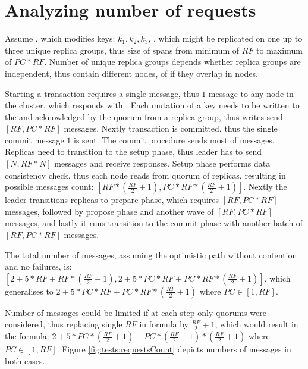 \section{Analyzing number of requests}
Assume \transaction, which modifies keys: $k_{1}, k_{2}, k_{3}$,
, which might be replicated on one up to three unique replica groups, thus size of \nodesTx spans from minimum of $RF$ to maximum of $PC*RF$. Number of unique replica groups depends whether replica groups are independent, thus contain different nodes, of if they overlap in nodes.

Starting a transaction requires a single message, thus $1$ message to any node in the cluster, which responds with \txState.
Each mutation of a key needs to be written to the \txStorage and acknowledged by the quorum from a replica group, thus writes send $[RF,PC*RF]$ messages.
Nextly transaction is committed, thus the single commit message $1$ is sent.
The commit procedure sends most of messages.
Replicas need to transition to the setup phase, thus leader has to send $[N,RF*N]$ messages and receive responses.
Setup phase performs data consistency check, thus each node reads from quorum of replicas, resulting in possible messages count: $[RF * (\frac{RF}{2} + 1),PC * RF * (\frac{RF}{2} + 1)]$.
Nextly the leader transitions replicas to prepare phase, which requires $[RF,PC*RF]$ messages, followed by propose phase and another wave of $[RF,PC*RF]$ messages, and lastly it runs transition to the commit phase with another batch of $[RF,PC*RF]$ messages.

The total number of messages, assuming the optimistic path without contention and no failures, 
is: $[2 + 5 * RF + RF * (\frac{RF}{2} + 1), 2 + 5 * PC*RF + PC * RF * (\frac{RF}{2} + 1)]$,
which generalises to $2 + 5 * PC*RF + PC * RF * (\frac{RF}{2} + 1)$ where $PC \in [1, RF]$.

Number of messages could be limited if at each step only quorums were considered, thus replacing single $RF$ in formula by $\frac{RF}{2} + 1$, which would result in the formula: 
$2 + 5 * PC*(\frac{RF}{2} + 1) + PC * (\frac{RF}{2} + 1) * (\frac{RF}{2} + 1)$ where $PC \in [1, RF]$.
Figure \ref{fig:tests:requestsCount} depicts numbers of messages in both cases.


